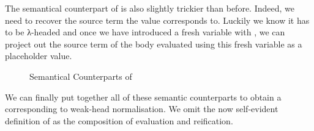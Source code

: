 The semantical counterpart of  is also slightly trickier than before. Indeed, we
need to recover the source term the value corresponds to. Luckily we know it has to be
λ-headed and once we have introduced a fresh variable with , we can project
out the source term of the body evaluated using this fresh variable as a placeholder
value.

\begin{figure}[h]
\caption{Semantical Counterparts of \label{fig:betaiotalam}}
\end{figure}

We can finally put together all of these semantic counterparts to
obtain a  corresponding to weak-head normalisation.
We omit the now self-evident definition of  as the
composition of evaluation and reification.
